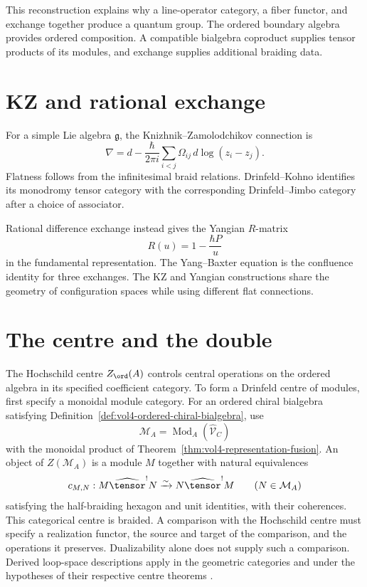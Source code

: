 This reconstruction explains why a line-operator category, a fiber functor, and exchange together produce a quantum group. The ordered boundary algebra provides ordered composition.  A compatible bialgebra coproduct supplies tensor products of its modules, and exchange supplies additional braiding data.

\chapter{KZ and rational exchange}
For a simple Lie algebra $\mathfrak g$, the Knizhnik--Zamolodchikov connection is
\[
 \nabla=d-\frac{\hbar}{2\pi i}
 \sum_{i<j}\Omega_{ij}\,d\log(z_i-z_j).
\]
Flatness follows from the infinitesimal braid relations. Drinfeld--Kohno identifies its monodromy tensor category with the corresponding Drinfeld--Jimbo category after a choice of associator.

Rational difference exchange instead gives the Yangian $R$-matrix
\[
 R(u)=1-\frac{\hbar P}{u}
\]
in the fundamental representation. The Yang--Baxter equation is the confluence identity for three exchanges. The KZ and Yangian constructions share the geometry of configuration spaces while using different flat connections.

\chapter{The centre and the double}
The Hochschild centre $Z_{\ord}(A)$ controls central operations on the
ordered algebra in its specified coefficient category.
To form a Drinfeld centre of modules, first specify a monoidal module category.
For an ordered chiral bialgebra satisfying
Definition~\ref{def:vol4-ordered-chiral-bialgebra}, use
\[
 \mathcal M_A=\operatorname{Mod}_A(\widehat{\mathcal V}_C)
\]
with the monoidal product of Theorem~\ref{thm:vol4-representation-fusion}.
An object of $Z(\mathcal M_A)$ is a module $M$ together with natural equivalences
\[
 c_{M,N}:M\widehat{\tensor}^{!}N
 \xrightarrow{\sim}N\widehat{\tensor}^{!}M
 \qquad(N\in\mathcal M_A)
\]
satisfying the half-braiding hexagon and unit identities, with their coherences.
This categorical centre is braided.
A comparison with the Hochschild centre must specify a realization functor,
the source and target of the comparison, and the operations it preserves.
Dualizability alone does not supply such a comparison.
Derived loop-space descriptions apply in the geometric categories and
under the hypotheses of their respective centre theorems
\cite{BenZviFrancisNadler}.

